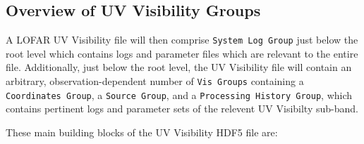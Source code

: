 \documentclass[a4paper,10pt,bibtotoc]{scrartcl}
\begin{document}
\subsection{Overview of UV Visibility Groups}

A LOFAR UV Visibility file will then comprise \texttt{System Log
  Group} just below the root level which contains logs and parameter
files which are relevant to the entire file.  Additionally, just below
the root level, the UV Visibility file will contain an arbitrary,
observation-dependent number of \texttt{Vis Groups} containing a
\texttt{Coordinates Group}, a \texttt{Source Group}, and a
\texttt{Processing History Group}, which contains pertinent logs and
parameter sets of the relevent UV Visibilty sub-band.

These main building blocks of the UV Visibility HDF5 file are:
\end{document}
